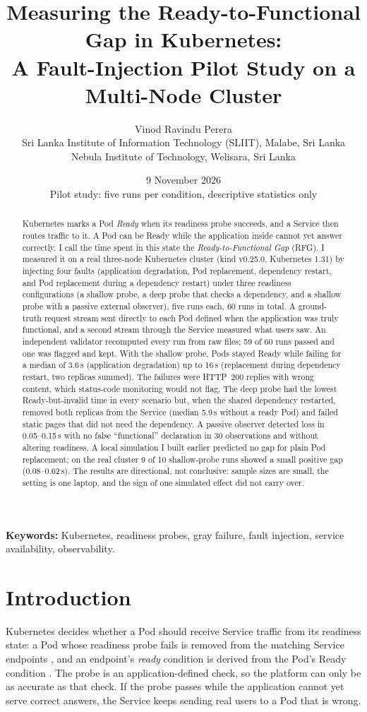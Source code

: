 \documentclass[11pt,a4paper]{article}
\title{\textbf{Measuring the Ready-to-Functional Gap in Kubernetes:\\ A Fault-Injection Pilot Study on a Multi-Node Cluster}}
\author{Vinod Ravindu Perera\\[2pt]
{\small Sri Lanka Institute of Information Technology (SLIIT), Malabe, Sri Lanka}\\{\small Nebula Institute of Technology, Welisara, Sri Lanka}}
\date{9 November 2026\\[2pt]\small Pilot study: five runs per condition, descriptive statistics only}
\begin{document}
\maketitle

\begin{abstract}
Kubernetes marks a Pod \emph{Ready} when its readiness probe succeeds, and a Service then routes traffic to it. A Pod can be Ready while the application inside cannot yet answer correctly. I call the time spent in this state the \emph{Ready-to-Functional Gap} (RFG). I measured it on a real three-node Kubernetes cluster (kind v0.25.0, Kubernetes 1.31) by injecting four faults (application degradation, Pod replacement, dependency restart, and Pod replacement during a dependency restart) under three readiness configurations (a shallow probe, a deep probe that checks a dependency, and a shallow probe with a passive external observer), five runs each, 60 runs in total. A ground-truth request stream sent directly to each Pod defined when the application was truly functional, and a second stream through the Service measured what users saw. An independent validator recomputed every run from raw files; 59 of 60 runs passed and one was flagged and kept. With the shallow probe, Pods stayed Ready while failing for a median of 3.6\,s (application degradation) up to 16\,s (replacement during dependency restart, two replicas summed). The failures were HTTP~200 replies with wrong content, which status-code monitoring would not flag. The deep probe had the lowest Ready-but-invalid time in every scenario but, when the shared dependency restarted, removed both replicas from the Service (median 5.9\,s without a ready Pod) and failed static pages that did not need the dependency. A passive observer detected loss in 0.05--0.15\,s with no false ``functional'' declaration in 30 observations and without altering readiness. A local simulation I built earlier predicted no gap for plain Pod replacement; on the real cluster 9 of 10 shallow-probe runs showed a small positive gap (0.08--0.62\,s). The results are directional, not conclusive: sample sizes are small, the setting is one laptop, and the sign of one simulated effect did not carry over.
\end{abstract}

\noindent\textbf{Keywords:} Kubernetes, readiness probes, gray failure, fault injection, service availability, observability.

\section{Introduction}
Kubernetes decides whether a Pod should receive Service traffic from its readiness state: a Pod whose readiness probe fails is removed from the matching Service endpoints \citep{k8sprobes}, and an endpoint's \emph{ready} condition is derived from the Pod's Ready condition \citep{k8sendpointslices}. The probe is an application-defined check, so the platform can only be as accurate as that check. If the probe passes while the application cannot yet serve correct answers, the Service keeps sending real users to a Pod that is wrong.
\end{document}
